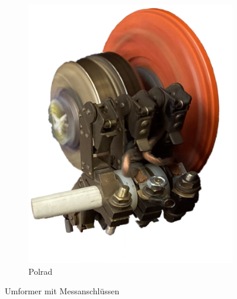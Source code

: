 \begin{figure}
\begin{subfigure}[t]{.2\textwidth}
          \includegraphics[]{Bilder/Polrad_freigestellt.png}
          \caption{Polrad}
          \label{fig:Umformer_Polrad}
     \end{subfigure}\hfill%
    \caption{Umformer mit Messanschlüssen}
    \label{fig:Messaufbau}
\end{figure}

